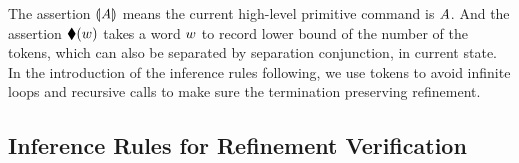 The assertion $\llparenthesis {\textit{A}} \rrparenthesis$ means the 
current high-level primitive command is $\textit{A}$. 
And the assertion $\blacklozenge({w})$ takes a word $w$ 
to record lower bound of the number of the tokens, 
which can also be separated by separation conjunction, 
in current state. In the 
introduction of the inference rules following, we use tokens 
to avoid infinite loops and recursive calls to make sure 
the termination preserving refinement. 

\subsection{Inference Rules for Refinement Verification}
\label{subsec:logic-rule-refinemet}

